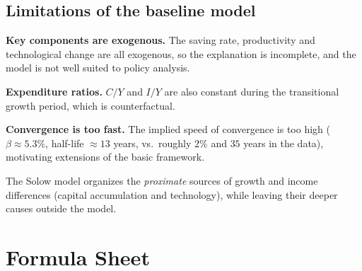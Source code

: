 \documentclass[11pt]{article}
\begin{document}
\subsection{Limitations of the baseline model}
\begin{flatnum}
  \item \textbf{Key components are exogenous.} The saving rate, productivity and technological change are all exogenous, so the explanation is incomplete, and the model is not well suited to policy analysis.
  \item \textbf{Expenditure ratios.} $C/Y$ and $I/Y$ are also constant during the transitional growth period, which is counterfactual.
  \item \textbf{Convergence is too fast.} The implied speed of convergence is too high ($\beta \approx 5.3\%$, half-life $\approx 13$ years, vs.\ roughly $2\%$ and $35$ years in the data), motivating extensions of the basic framework.
\end{flatnum}

\begin{keyresult}
The Solow model organizes the \emph{proximate} sources of growth and income differences (capital accumulation and technology), while leaving their deeper causes outside the model.
\end{keyresult}

\newpage
\section*{Formula Sheet}
\end{document}
